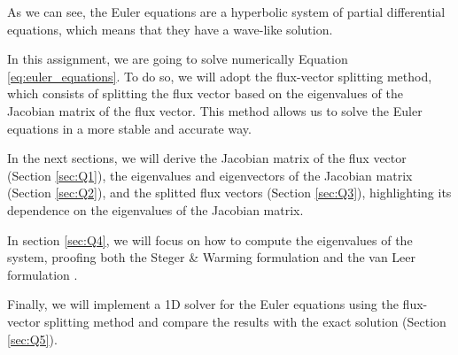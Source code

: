 As we can see, the Euler equations are a hyperbolic system of partial differential equations, which means that they have a wave-like solution.

In this assignment, we are going to solve numerically Equation \ref{eq:euler_equations}.
To do so, we will adopt the flux-vector splitting method, which consists of splitting the flux vector based on the eigenvalues of the Jacobian matrix of the flux vector.
This method allows us to solve the Euler equations in a more stable and accurate way.

In the next sections, we will derive the Jacobian matrix of the flux vector (Section \ref{sec:Q1}), the eigenvalues and eigenvectors of the Jacobian matrix (Section \ref{sec:Q2}), and the splitted flux vectors (Section \ref{sec:Q3}), highlighting its dependence on the eigenvalues of the Jacobian matrix.

In section \ref{sec:Q4}, we will focus on how to compute the eigenvalues of the system, proofing both the Steger \& Warming formulation \cite{Steger-Warming} and the van Leer formulation \cite{van-Leer}.

Finally, we will implement a 1D solver for the Euler equations using the flux-vector splitting method and compare the results with the exact solution (Section \ref{sec:Q5}).
